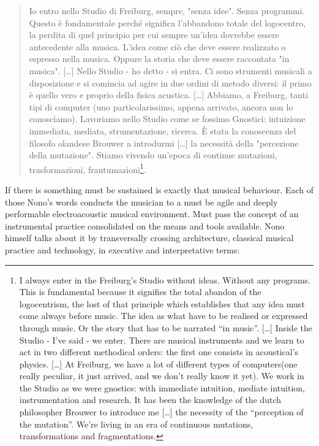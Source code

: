 \documentclass[twoside,a4paper]{article}
\begin{document}
\begin{quote}
Io entro nello Studio di Freiburg, sempre, "senza idee". Senza programmi. Questo è fondamentale perché significa l'abbandono totale del logocentro, la perdita di quel principio per cui sempre un'idea dovrebbe essere antecedente alla musica. L'idea come ciò che deve essere realizzato o espresso nella musica. Oppure la storia che deve essere raccontata "in musica". [\ldots] Nello Studio - ho detto - si entra. Ci sono strumenti musicali a disposizione e si comincia ad agire in due ordini di metodo diversi: il primo è quello vero e proprio della fisica acustica. [\ldots] Abbiamo, a Freiburg, tanti tipi di computer (uno particolarissimo, appena arrivato, ancora non lo conosciamo). Lavoriamo nello Studio come se fossimo Gnostici: intuizione immediata, mediata, strumentazione, ricerca. È stata la conoscenza del filosofo olandese Brouwer a introdurmi [\ldots] la necessità della "percezione della mutazione". Stiamo vivendo un'epoca di continue mutazioni, trasformazioni, frantumazioni\cite{nono85}\footnote{I always enter in the Freiburg’s Studio without ideas. Without any programs. This is fundamental because it signifies the total abandon of the logocentrism, the lost of that principle which establishes that any idea must come always before music. The idea as what have to be realised or expressed through music. Or the story that has to be narrated “in music”. [\dots] Inside the Studio - I’ve said - we enter. There are musical instruments and we learn to act in two different methodical orders: the first one consists in acoustical’s physics. [\dots] At Freiburg, we have a lot of different types of computers(one really peculiar, it just arrived, and we don’t really know it yet). We work in the Studio as we were gnostics: with immediate intuition, mediate intuition, instrumentation and research. It has been the knowledge of the dutch philosopher Brouwer to introduce me [\dots] the necessity of the “perception of the mutation”. We’re living in an era of continuous mutations, transformations and fragmentations.}. 
\end{quote}

If there is something must be sustained is exactly that musical behaviour. Each of those Nono's words conducts the musician to a must be agile and deeply performable electroacoustic musical environment. Must pass the concept of an instrumental practice consolidated on the means and tools available. Nono himself talks about it by transversally crossing architecture, classical musical practice and technology, in executive and interpretative terms:
\end{document}
